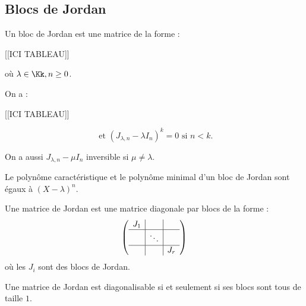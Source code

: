 \documentclass[class=report,crop=false]{standalone}
\begin{document}
\subsection{Blocs de Jordan}
\begin{definition}
Un bloc de Jordan  est une matrice de la forme :

[[ICI TABLEAU]]


où $\lambda \in \Kk, n \ge 0$.
\end{definition}

On a :

[[ICI TABLEAU]]



\[\text{ et } (J_{\lambda,n}-\lambda I_n)^k = 0 \mbox{ si $n < k$.}\]

On a aussi $J_{\lambda,n}-\mu I_n$ inversible si $\mu \neq \lambda$.

\begin{exercicecours}
Le polynôme caractéristique et le polynôme minimal d'un bloc de Jordan sont égaux à $(X-\lambda)^n$.
\end{exercicecours}

\begin{definition}
Une matrice de Jordan  est une matrice diagonale par blocs de la forme :
\[\left(\begin{array}{c|c|c}
J_1&&\\\hline
&\ddots&\\\hline
&&J_r
\end{array}\right)\]
où les $J_i$ sont des blocs de Jordan.
\end{definition}

\begin{exercicecours}
Une matrice de Jordan est diagonalisable si et seulement si ses blocs sont tous de taille $1$.
\end{exercicecours}
\end{document}
